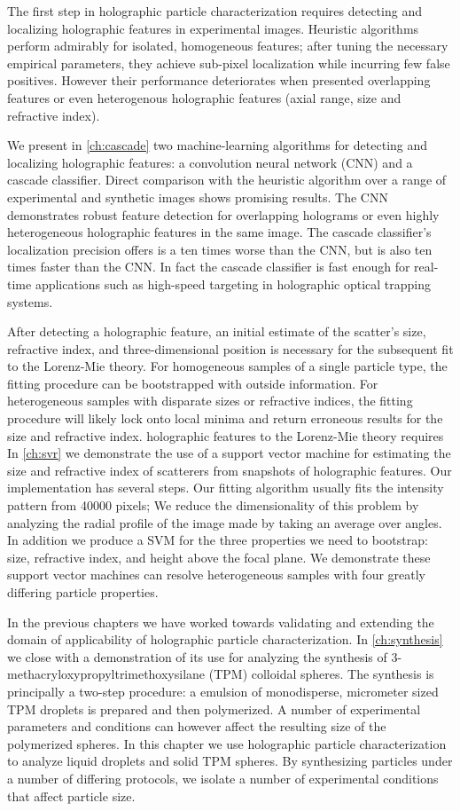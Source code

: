 The first step in holographic particle characterization
requires detecting and localizing holographic features in experimental
images. Heuristic algorithms perform admirably for isolated, homogeneous
features; after tuning the necessary empirical parameters, they achieve
sub-pixel localization while incurring few false positives. However their
performance deteriorates when presented overlapping features or even
heterogenous holographic features (axial range, size and refractive index).

We present in \autoref{ch:cascade} two machine-learning algorithms for
detecting and localizing holographic features: a convolution
neural network (CNN) and a cascade classifier. Direct comparison with the
heuristic algorithm over a range of experimental and synthetic images
shows promising results. The CNN demonstrates robust feature detection
for overlapping holograms or even highly heterogeneous holographic features
in the same image. The cascade classifier's localization precision
offers is a ten times worse than the CNN, but is also ten times faster than
the CNN. In fact the cascade classifier is fast enough for real-time
applications such as high-speed targeting in holographic optical
trapping systems.

After detecting a holographic feature, an initial estimate of the
scatter's size, refractive index, and three-dimensional position
is necessary for the subsequent fit to the Lorenz-Mie theory.
For homogeneous samples of a single particle type, the fitting procedure
can be bootstrapped with outside information. For heterogeneous samples
with disparate sizes or refractive indices, the fitting procedure
will likely lock onto local minima and return erroneous results for
the size and refractive index. holographic features to the Lorenz-Mie theory requires
In \autoref{ch:svr} we demonstrate the use of a support vector machine for
estimating the size and refractive index of scatterers from snapshots
of holographic features. Our implementation has several steps. Our fitting
algorithm usually fits the intensity pattern from \SI{40000}{} pixels;
We reduce the dimensionality of this problem by analyzing the radial
profile of the image made by taking an average over angles. In addition
we produce a SVM for the three properties we need to bootstrap:
size, refractive index, and height above the focal plane. We demonstrate these
support vector machines can resolve heterogeneous samples with four greatly
differing particle properties.

In the previous chapters we have worked towards validating and extending
the domain of applicability of holographic particle characterization.
In \autoref{ch:synthesis} we close with a demonstration of its use for
analyzing the synthesis of \num{3}-methacryloxypropyltrimethoxysilane (TPM) colloidal
spheres. The synthesis is principally a two-step procedure: a emulsion of monodisperse,
micrometer sized TPM droplets is prepared and then polymerized.
A number of experimental parameters and conditions can however affect
the resulting size of the polymerized spheres. In this chapter we use
holographic particle characterization to analyze liquid droplets and
solid TPM spheres. By synthesizing particles under a number of
differing protocols, we isolate a number of experimental conditions
that affect particle size.
